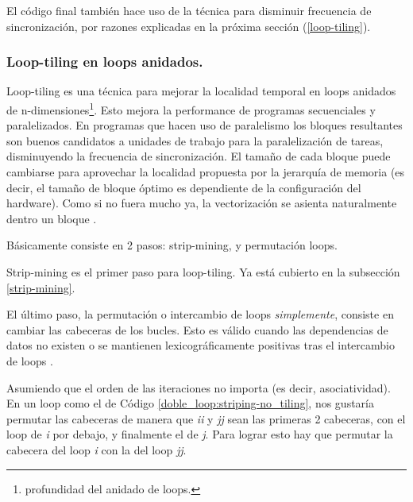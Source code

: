 \documentclass{article}
\begin{document}
El código final también hace uso de la técnica para disminuir frecuencia de sincronización, por
razones explicadas en la próxima sección (\ref{loop-tiling}).

\subsubsection{Loop-tiling en loops anidados.\label{loop-tiling}}

Loop-tiling es una técnica para mejorar la localidad temporal en loops anidados de
n-dimensiones\footnote{profundidad del anidado de loops.}. Esto mejora la performance
de programas secuenciales y paralelizados. En programas que hacen uso de paralelismo los bloques resultantes
son buenos candidatos a unidades de trabajo para la paralelización de tareas, disminuyendo
la frecuencia de sincronización. El tamaño de cada bloque puede
cambiarse para aprovechar la localidad propuesta por la jerarquía de memoria (es decir, el tamaño de bloque
óptimo es dependiente de la configuración del hardware). Como si no fuera mucho ya, la vectorización
se asienta naturalmente dentro un bloque \cite{Wolfe89moreiteration}.

Básicamente consiste en 2 pasos: strip-mining, y permutación loops.

Strip-mining es el primer paso para loop-tiling. Ya está cubierto en la subsección \ref{strip-mining}.

El último paso, la permutación o intercambio de loops \textit{simplemente}, consiste en cambiar las cabeceras de los bucles.
Esto es válido cuando las dependencias de datos no existen o se mantienen lexicográficamente positivas
tras el intercambio de loops \cite{Laforest10ece1754}.

Asumiendo que el orden de las iteraciones no importa (es decir, asociatividad).
En un loop como el de Código \ref{doble_loop:striping-no_tiling}, nos gustaría permutar las cabeceras de manera que
\textit{ii} y \textit{jj} sean las primeras 2 cabeceras, con el loop de \textit{i} por debajo, y finalmente
el de \textit{j}. Para lograr esto hay que permutar la cabecera del loop \textit{i} con la del loop \textit{jj}.
\end{document}
